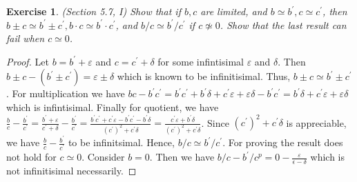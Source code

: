 \documentclass[a4paper, 11pt, openany]{book}
\theoremstyle{plain}
\newtheorem{exercise}{Exercise}[chapter]
\theoremstyle{plain}
\newcommand{\p}{\prime}
\newcommand{\ep}{\varepsilon}
\newcommand{\del}{\delta}
\begin{document}
  \begin{exercise}
    (Section 5.7, I)
    Show that if $b,c$ are limited, and $b \simeq b^\p, c \simeq c^\p$, then $b \pm c \simeq b^\p \pm c^\p, b\cdot c \simeq b^\p \cdot c^\p$, and $b/c \simeq b^\p/c^\p$ if $c \not \simeq 0$. Show that the last result can fail when $c \simeq 0$.
  \end{exercise}
  \begin{proof}
    Let $b=b^\p+\ep$ and $c=c^\p +\del$ for some infintisimal $\ep$ and $\del$. Then $b \pm c - (b^\p \pm c^\p)=\ep \pm \del$ which is known to be infinitisimal. Thus, $b \pm c \simeq b^\p \pm c^\p$. For multiplication we have $bc-b^\p c^\p=b^\p c^\p+b^\p \del +c^\p \ep + \ep \del -b^\p c^\p=b^\p \del +c^\p \ep + \ep \del$ which is infintisimal. Finally for quotient, we have $\frac{b}{c}-\frac{b^\p}{c^\p}=\frac{b^\p +\ep}{c^\p+\del}-\frac{b^\p}{c^\p}=\frac{b^\p c^\p+c^\p \ep -b^\p c^\p-b^\p \del}{(c^\p)^2+c^\p \del}=\frac{c^\p \ep+b^\p \del}{(c^\p)^2+c^\p \del}$. Since $(c^\p)^2+c^\p \del$ is appreciable, we have $\frac{b}{c}-\frac{b^\p}{c^\p}$ to be infinitsimal. Hence, $b/c \simeq b^\p/c^\p$. For proving the result does not hold for $c \simeq 0$. Consider $b=0$. Then we have $b/c-b^\p/c^p=0-\frac{\ep}{\epsilon-\delta}$ which is not infinitisimal necessarily.
  \end{proof}
\end{document}
